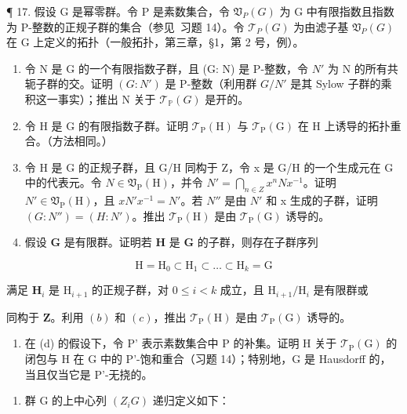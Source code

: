 ¶ 17. 假设 G 是幂零群。令 P 是素数集合，令 \(\mathfrak{V}_{P}(G)\) 为 G 中有限指数且指数为 P-整数的正规子群的集合（参见~习题 14）。令 \(\mathcal{T}_{P}(G)\) 为由滤子基 \(\mathfrak{V}_{P}(G)\) 在 G 上定义的拓扑（一般拓扑，第三章，§1，第 2 号，例）。

\begin{enumerate}
\def\labelenumi{(\alph{enumi})}
\item
  令 N 是 G 的一个有限指数子群，且 (G: N) 是 P-整数，令 \(N'\) 为 N 的所有共轭子群的交。证明 \((G: N')\) 是 P-整数（利用群 \(G/N'\) 是其 Sylow 子群的乘积这一事实）；推出 N 关于 \(\mathcal{T}_{\mathbb{P}}(G)\) 是开的。
\item
  令 H 是 G 的有限指数子群。证明 \(\mathcal{T}_{\mathrm{P}}(\mathrm{H})\) 与 \(\mathcal{T}_{\mathrm{P}}(\mathrm{G})\) 在 H 上诱导的拓扑重合。（方法相同。）
\item
  令 H 是 G 的正规子群，且 G/H 同构于 Z，令 x 是 G/H 的一个生成元在 G 中的代表元。令 \(N \in \mathfrak{V}_{\mathrm{P}}(\mathrm{H})\)，并令 \(N' = \bigcap_{n \in Z} x^{n} N x^{-1}\)。证明 \(N' \in \mathfrak{V}_{\mathrm{P}}(\mathrm{H})\)，且 \(x N' x^{-1} = N'\)。若 \(N''\) 是由 \(N'\) 和 x 生成的子群，证明 \((G: N'') = (H: N')\)。推出 \(\mathcal{T}_{\mathrm{P}}(\mathrm{H})\) 是由 \(\mathcal{T}_{\mathrm{P}}(\mathrm{G})\) 诱导的。
\item
  假设 \(\mathbf{G}\) 是有限群。证明若 \(\mathbf{H}\) 是 \(\mathbf{G}\) 的子群，则存在子群序列
\end{enumerate}

\[
\mathrm{H} = \mathrm{H} _ {0} \subset \mathrm{H} _ {1} \subset \dots \subset \mathrm{H} _ {k} = \mathrm{G}
\]

满足 \(\mathbf{H}_i\) 是 \(\mathrm{H}_{i + 1}\) 的正规子群，对 \(0\leqslant i < k\) 成立，且 \(\mathrm{H}_{i + 1} / \mathrm{H}_i\) 是有限群或

同构于 \(\mathbf{Z}\)。利用 \((b)\) 和 \((c)\)，推出 \(\mathcal{T}_{\mathrm{P}}(\mathrm{H})\) 是由 \(\mathcal{T}_{\mathrm{P}}(\mathrm{G})\) 诱导的。

\begin{enumerate}
\def\labelenumi{(\alph{enumi})}
\setcounter{enumi}{4}
\tightlist
\item
  在 (d) 的假设下，令 P' 表示素数集合中 P 的补集。证明 H 关于 \(\mathcal{T}_{\mathrm{P}}(\mathrm{G})\) 的闭包与 H 在 G 中的 P'-饱和重合（习题 14）；特别地，G 是 Hausdorff 的，当且仅当它是 P'-无挠的。
\end{enumerate}

\begin{enumerate}
\def\labelenumi{\arabic{enumi}.}
\setcounter{enumi}{17}
\tightlist
\item
  群 G 的上中心列 \((Z_{i}G)\) 递归定义如下：
\end{enumerate}

